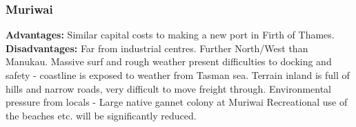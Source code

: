 \begin{multicols}{2}
    \subsubsection*{Muriwai}
        \textbf{Advantages: }{Similar capital costs to making a new port in Firth of Thames.}
        \\\textbf{Disadvantages: }{Far from industrial centres. Further North/West than Manukau. Massive surf and rough weather present difficulties to docking and safety - coastline is exposed to weather from Tasman sea. Terrain inland is full of hills and narrow roads, very difficult to move freight through. Environmental pressure from locals - Large native gannet colony at Muriwai Recreational use of the beaches etc. will be significantly reduced.}  
    
\end{multicols} 

\clearpage
